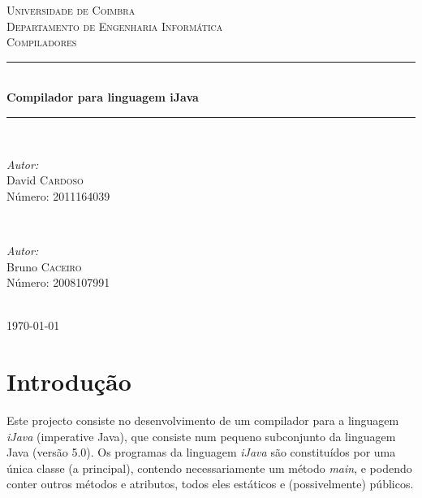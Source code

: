 \documentclass[12pt]{article}
\begin{document}
\begin{titlepage}

\newcommand{\HRule}{\rule{\linewidth}{0.5mm}} 
\center 
 

\textsc{\LARGE Universidade de Coimbra}\\[1.5cm] %
\textsc{\Large Departamento de Engenharia Informática}\\[4cm] %
\textsc{\large Compiladores}\\[1cm] %


\HRule \\[0.5cm]
{ \huge \bfseries Compilador para linguagem iJava}\\[0.4cm] 
\HRule \\[8cm]
 
\begin{minipage}{0.4\textwidth}
\begin{flushleft} \large
\emph{Autor:}\\
David \textsc{Cardoso}  \\Número: 2011164039
\end{flushleft}
\end{minipage}
~
\begin{minipage}{0.4\textwidth}
\begin{flushright} \large
\emph{Autor:} \\
Bruno \textsc{Caceiro}  \\Número: 2008107991
\end{flushright}
\end{minipage}\\[2cm]

{\large \today}\\[3cm]

\vfill

\end{titlepage}



\section{Introdução}
Este projecto consiste no desenvolvimento de um compilador para a linguagem \emph{iJava} (imperative Java), que consiste num pequeno subconjunto da linguagem Java (versão 5.0). Os programas da linguagem \emph{iJava} são constituídos por uma única classe (a principal), contendo necessariamente um método \emph{main}, e podendo conter outros métodos e atributos, todos eles estáticos e (possivelmente) públicos.
\end{document}
